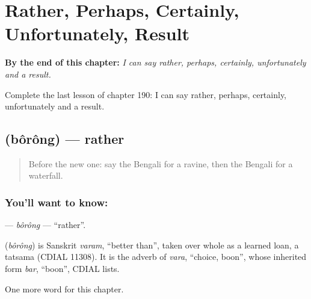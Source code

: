 
\chapter{Rather, Perhaps, Certainly, Unfortunately, Result}
\label{ch:bn-rather-perhaps-certainly-unfortunately-result}

\begin{chapteropening}
\textbf{By the end of this chapter:} \emph{I can say rather, perhaps, certainly, unfortunately and a result.}

Complete the last lesson of chapter 190: I can say rather, perhaps, certainly, unfortunately and a result.
\end{chapteropening}

\section[\texorpdfstring{\bn{বরং} (bôrông)}{বরং (bôrông)}]{ (bôrông) — rather}

\label{lesson:BN-C190-borong}



\begin{quote}
Before the new one: say the Bengali for a ravine, then the Bengali for a waterfall.
\end{quote}

\subsection*{You'll want to know: }
\textbf{} — \emph{bôrông} — \textquotedblleft{}rather\textquotedblright{}.

\begin{cousinweb}
\textbf{} (\emph{bôrông}) is Sanskrit \emph{varam}, \textquotedblleft{}better than\textquotedblright{}, taken over whole as a learned loan, a tatsama (CDIAL 11308). It is the adverb of \emph{vara}, \textquotedblleft{}choice, boon\textquotedblright{}, whose inherited form \emph{bar}, \textquotedblleft{}boon\textquotedblright{}, CDIAL lists.
\end{cousinweb}

\begin{grammarlens}[title={What you've built}]
One more word for this chapter.
\end{grammarlens}


